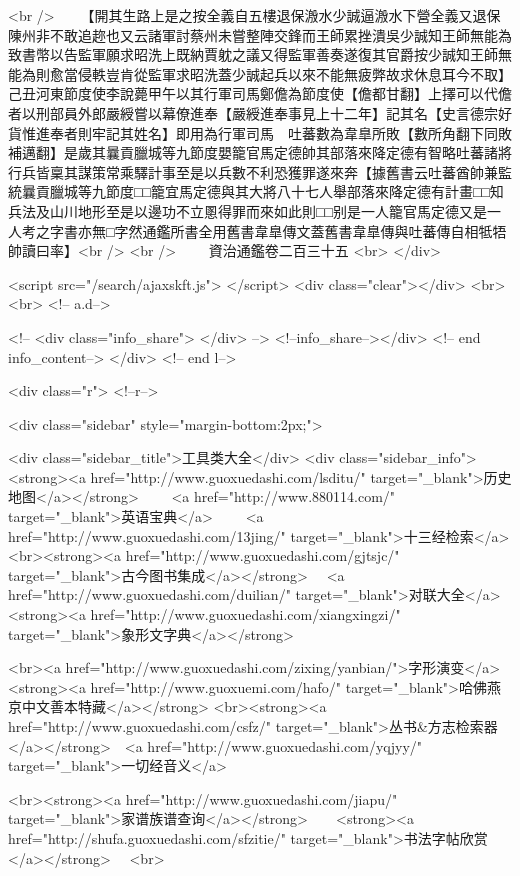 <br />
　　【開其生路上是之按全義自五樓退保溵水少誠逼溵水下營全義又退保陳州非不敢追趂也又云諸軍討蔡州未嘗整陣交鋒而王師累挫潰吳少誠知王師無能為致書幣以告監軍願求昭洗上既納賈躭之議又得監軍善奏遂復其官爵按少誠知王師無能為則愈當侵軼豈肯從監軍求昭洗蓋少誠起兵以來不能無疲弊故求休息耳今不取】　己丑河東節度使李說薨甲午以其行軍司馬鄭儋為節度使【儋都甘翻】上擇可以代儋者以刑部員外郎嚴綬嘗以幕僚進奉【嚴綬進奉事見上十二年】記其名【史言德宗好貨惟進奉者則牢記其姓名】即用為行軍司馬　吐蕃數為韋臯所敗【數所角翻下同敗補邁翻】是歲其曩貢臘城等九節度嬰籠官馬定德帥其部落來降定德有智略吐蕃諸將行兵皆稟其謀策常乘驛計事至是以兵數不利恐獲罪遂來奔【據舊書云吐蕃酋帥兼監統曩貢臘城等九節度□□籠宜馬定德與其大將八十七人舉部落來降定德有計畫□□知兵法及山川地形至是以邊功不立慁得罪而來如此則□□别是一人籠官馬定德又是一人考之字書亦無□字然通鑑所書全用舊書韋臯傳文蓋舊書韋臯傳與吐蕃傳自相牴牾帥讀曰率】<br />
<br />
　　資治通鑑卷二百三十五  <br>
   </div> 

<script src="/search/ajaxskft.js"> </script>
 <div class="clear"></div>
<br>
<br>
 <!-- a.d-->

 <!--
<div class="info_share">
</div> 
-->
 <!--info_share--></div>   <!-- end info_content-->
  </div> <!-- end l-->

<div class="r">   <!--r-->



<div class="sidebar"  style="margin-bottom:2px;">

 
<div class="sidebar_title">工具类大全</div>
<div class="sidebar_info">
<strong><a href="http://www.guoxuedashi.com/lsditu/" target="_blank">历史地图</a></strong>　　
<a href="http://www.880114.com/" target="_blank">英语宝典</a>　　
<a href="http://www.guoxuedashi.com/13jing/" target="_blank">十三经检索</a>　
<br><strong><a href="http://www.guoxuedashi.com/gjtsjc/" target="_blank">古今图书集成</a></strong>　
<a href="http://www.guoxuedashi.com/duilian/" target="_blank">对联大全</a>　<strong><a href="http://www.guoxuedashi.com/xiangxingzi/" target="_blank">象形文字典</a></strong>　

<br><a href="http://www.guoxuedashi.com/zixing/yanbian/">字形演变</a>　　<strong><a href="http://www.guoxuemi.com/hafo/" target="_blank">哈佛燕京中文善本特藏</a></strong>
<br><strong><a href="http://www.guoxuedashi.com/csfz/" target="_blank">丛书&方志检索器</a></strong>　<a href="http://www.guoxuedashi.com/yqjyy/" target="_blank">一切经音义</a>　　

<br><strong><a href="http://www.guoxuedashi.com/jiapu/" target="_blank">家谱族谱查询</a></strong>　　<strong><a href="http://shufa.guoxuedashi.com/sfzitie/" target="_blank">书法字帖欣赏</a></strong>　
<br>

